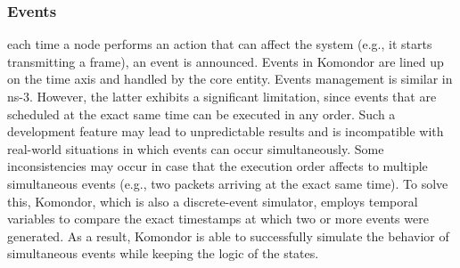 \documentclass[conference]{IEEEtran}
\begin{document}
	\subsubsection{Events}
	each time a node performs an action that can affect the system (e.g., it starts transmitting a frame), an event is announced. Events in Komondor are lined up on the time axis and handled by the core entity. Events management is similar in ns-3. However, the latter exhibits a significant limitation, since events that are scheduled at the exact same time can be executed in any order. Such a development feature may lead to unpredictable results and is incompatible with real-world situations in which events can occur simultaneously. Some inconsistencies may occur in case that the execution order affects to multiple simultaneous events (e.g., two packets arriving at the exact same time). To solve this, Komondor, which is also a discrete-event simulator, employs temporal variables to compare the exact timestamps at which two or more events were generated. As a result, Komondor is able to successfully simulate the behavior of simultaneous events while keeping the logic of the states.
	
	
\end{document}
